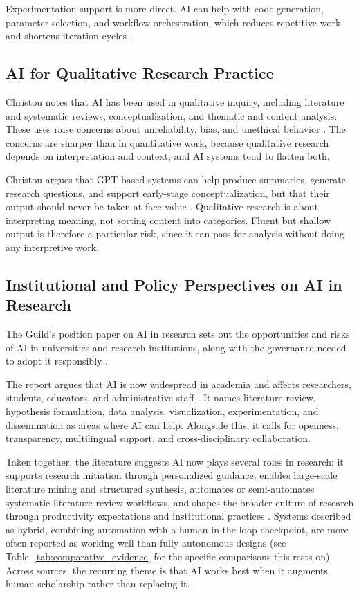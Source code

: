 \documentclass[sn-basic,Numbered]{sn-jnl}
\begin{document}
Experimentation support is more direct. AI can help with code
generation, parameter selection, and workflow orchestration, which
reduces repetitive work and shortens iteration cycles
\cite{eger2025transformingscience}.

\subsection{AI for Qualitative Research Practice}

Christou notes that AI has been used in qualitative inquiry, including
literature and systematic reviews, conceptualization, and thematic and
content analysis. These uses raise concerns about unreliability, bias,
and unethical behavior \cite{christou2023qualitative}. The concerns are
sharper than in quantitative work, because qualitative research depends
on interpretation and context, and AI systems tend to flatten both.

Christou argues that GPT-based systems can help produce summaries,
generate research questions, and support early-stage conceptualization,
but that their output should never be taken at face value
\cite{christou2023qualitative}. Qualitative research is about
interpreting meaning, not sorting content into categories. Fluent but
shallow output is therefore a particular risk, since it can pass for
analysis without doing any interpretive work.

\subsection{Institutional and Policy Perspectives on AI in Research}

The Guild's position paper on AI in research sets out the opportunities
and risks of AI in universities and research institutions, along with
the governance needed to adopt it responsibly \cite{guild2024ai}.

The report argues that AI is now widespread in academia and affects
researchers, students, educators, and administrative staff
\cite{guild2024ai}. It names literature review, hypothesis formulation,
data analysis, visualization, experimentation, and dissemination as
areas where AI can help. Alongside this, it calls for openness,
transparency, multilingual support, and cross-disciplinary collaboration.

Taken together, the literature suggests AI now plays several roles in
research: it supports research initiation through personalized
guidance, enables large-scale literature mining and structured
synthesis, automates or semi-automates systematic literature review
workflows, and shapes the broader culture of research through
productivity expectations and institutional practices
\cite{vishnumolakala2024arc,lian2025literature,bolanos2024ailitreview,chubb2022exploring}.
Systems described as hybrid, combining automation with a human-in-the-loop
checkpoint, are more often reported as working well than fully
autonomous designs (see Table~\ref{tab:comparative_evidence} for the
specific comparisons this rests on). Across sources, the recurring
theme is that AI works best when it augments human scholarship rather
than replacing it.
\end{document}
